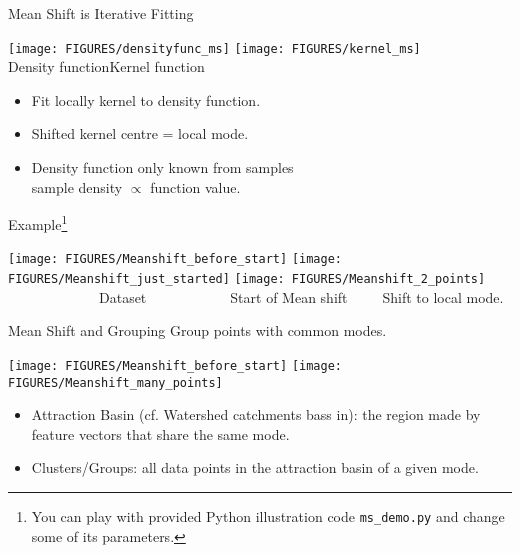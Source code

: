 \documentclass[9pt]{beamer}
\begin{document}
\begin{frame}{Mean Shift is Iterative Fitting}
  \begin{center}
    \texttt{[image: FIGURES/densityfunc\_ms]}\hfill
    \texttt{[image: FIGURES/kernel\_ms]}\hfill\\
    Density function\hfill Kernel function
  \end{center}
  \begin{itemize}
  \item Fit locally kernel to density function.
  \item Shifted kernel centre = local mode.
  \item Density function only known from samples\\sample density $\propto$ function value.
  \end{itemize}
\end{frame}


\begin{frame}{Example\footnote{You can play with provided Python illustration code \texttt{ms\_demo.py} and change some of its parameters.}}
  \begin{center}
    \texttt{[image: FIGURES/Meanshift\_before\_start]}\hfill
    \texttt{[image: FIGURES/Meanshift\_just\_started]}\hfill
    \texttt{[image: FIGURES/Meanshift\_2\_points]}\\
    ~~~~~~~~~~~~~Dataset~~~~~\hfill ~~~~~~~Start of Mean shift~~~~~\hfill Shift to local mode.
  \end{center}
\end{frame}

\begin{frame}{Mean Shift and Grouping}
  Group points with common modes.
 \begin{center}
    \texttt{[image: FIGURES/Meanshift\_before\_start]}\hfill
    \texttt{[image: FIGURES/Meanshift\_many\_points]}\\
  \end{center}
  \begin{itemize}
  \item   Attraction Basin (cf. Watershed catchments bass in): the region made
  by feature vectors that share the same mode.
\item Clusters/Groups: all data points in the attraction basin of a
  given mode.
  \end{itemize}
\end{frame}
\end{document}
